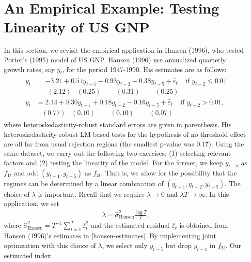 \documentclass[12pt, reqno]{amsart}
\begin{document}
\onehalfspacing

\section*{An Empirical Example: Testing Linearity of US GNP}

In this section, we revisit the empirical application in Hansen (1996), who tested Potter's (1995) model of US GNP. 
Hansen (1996) use annualized quarterly growth rates, say $y_t$, for the period 1947-1990.
His estimates are as follows:
\begin{align}\label{hansen-estimates}
\begin{split}
y_t &=  - 3.21 + 0.51 y_{t-1} - 0.93 y_{t-2} - 0.38 y_{t-5} + \widehat{\varepsilon}_t    \;\;\;\; \text{if $y_{t-2} \leq 0.01$} \\
      &   \;\;\;\;\;\; (2.12) \;\;\; (0.25)   \;\;\;\;\;\;\;\; (0.31)   \;\;\;\;\;\;\;\; (0.25)     \\
y_t &=  2.14 + 0.30 y_{t-1} + 0.18 y_{t-2} - 0.16 y_{t-5} + \widehat{\varepsilon}_t    \;\;\;\; \text{if $y_{t-2} > 0.01$,}  \\
      &   \;\;\; (0.77) \;\;\; (0.10)   \;\;\;\;\;\;\;\; (0.10)   \;\;\;\;\;\;\;\; (0.07)    
\end{split}
\end{align}
where heteroskedasticity-robust standard errors are given in parenthesis. His heteroskedasticity-robust LM-based tests for the hypothesis of no threshold effect are all far from usual rejection regions (the smallest p-value was 0.17).
Using the same dataset, we carry out the following two exercises: (1) selecting relevant factors and (2) testing the linearity of the model.
For the former, we 
keep $y_{t-2}$ as $f_{1t}$ and add  $(y_{t-1}, y_{t-5})$ as $f_{2t}$. That is, we allow for the possibility that the regimes can be determined by a linear combination of $(y_{t-1}, y_{t-2}, y_{t-5})$. 
The choice of $\lambda$ is important. Recall that we require $\lambda \rightarrow 0$ and $\lambda T \rightarrow \infty$. In this application,
we set 
\begin{align*}
\lambda = \widehat{\sigma}_{\text{Hansen}}^2 \frac{\log T}{T},
\end{align*}
where $\widehat{\sigma}_{\text{Hansen}}^2 = T^{-1} \sum_{t=1}^T \widehat{\varepsilon}_t^2$ and the estimated residual $\widehat{\varepsilon}_t$
is obtained from Hansen (1996)'s estimates in \eqref{hansen-estimates}.
By implementing joint optimzation with this choice of $\lambda$, we select only $y_{t-5}$ but drop $y_{t-1}$ in $f_{2t}$. Our estimated index 
\end{document}
